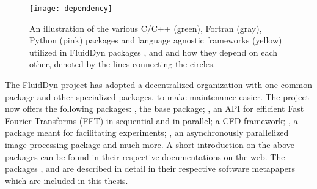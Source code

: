 \begin{figure}[h]
  \centering
  \texttt{[image: dependency]}
  \caption{An illustration of the various C/C++ (green), Fortran (gray), Python
  (pink) packages and language agnostic frameworks (yellow) utilized in
  FluidDyn packages ,  and  and
  how they depend on each other, denoted by the lines connecting the
  circles.}\label{fig:dependency}
\end{figure}

The FluidDyn project has adopted a decentralized organization with one common
package and other specialized packages, to make maintenance easier.
%
The project now offers the following packages:
%
,
the base package; %
, an API for efficient Fast Fourier Transforms (FFT) in sequential and in
parallel; 
a CFD framework; , a package meant for
facilitating experiments; , an asynchronously parallelized
image processing package and much more.
%
A short introduction on the above packages can be found in their respective
documentations on the web. The packages , 
and  are described in detail in their respective software
metapapers
\citep[]{fluiddyn, fluidfft, fluidsim} which are included in this thesis.
